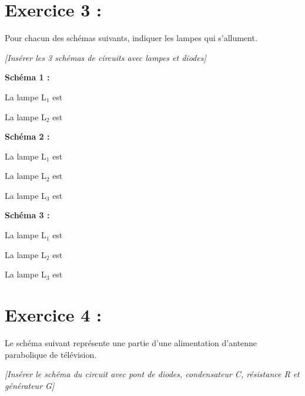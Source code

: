 \documentclass[11pt,a4paper]{article}
\begin{document}
\vspace{1em}

\section*{Exercice 3 :} 
Pour chacun des schémas suivants, indiquer les lampes qui s'allument.

\vspace{0.5em}

\begin{center}
\textit{[Insérer les 3 schémas de circuits avec lampes et diodes]}
\end{center}

\vspace{0.5cm}

\textbf{Schéma 1 :}

La lampe L$_1$ est \dotfill

La lampe L$_2$ est \dotfill

\vspace{1cm}

\textbf{Schéma 2 :}

La lampe L$_1$ est \dotfill

La lampe L$_2$ est \dotfill

La lampe L$_3$ est \dotfill

\vspace{1cm}

\textbf{Schéma 3 :}

La lampe L$_1$ est \dotfill

La lampe L$_2$ est \dotfill

La lampe L$_3$ est \dotfill

\newpage

\section*{Exercice 4 :}
Le schéma suivant représente une partie d'une alimentation d'antenne parabolique de télévision.

\vspace{0.5cm}

\begin{center}
\textit{[Insérer le schéma du circuit avec pont de diodes, condensateur C, résistance R et générateur G]}
\end{center}
\end{document}

